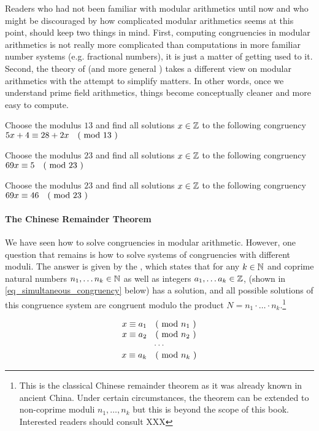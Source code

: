 Readers who had not been familiar with modular arithmetics until now and who might be discouraged by how complicated modular arithmetics seems at this point, should keep two things in mind. First, computing congruencies in modular arithmetics is not really more complicated than computations in more familiar number systems (e.g. fractional numbers), it is just a matter of getting used to it. Second, the theory of  (and more general ) takes a different view on modular arithmetics with the attempt to simplify matters. In other words, once we understand prime field arithmetics, things become conceptually cleaner and more easy to compute.
\begin{exercise}Choose the modulus $13$ and find all solutions $x\in \mathbb{Z}$ to the following congruency $5x+4 \equiv 28+2x \quad \text{( mod } 13 \text{ )}$
\end{exercise}
\begin{exercise}Choose the modulus $23$ and find all solutions $x\in \mathbb{Z}$ to the following congruency $69x \equiv 5 \quad \text{( mod } 23 \text{ )}$
\end{exercise}
\begin{exercise}Choose the modulus $23$ and find all solutions $x\in \mathbb{Z}$ to the following congruency $69x \equiv 46 \quad \text{( mod } 23 \text{ )}$
\end{exercise}
\paragraph{The Chinese Remainder Theorem} We have seen how to solve congruencies in modular arithmetic. However, one question that remains is how to solve systems of congruencies with different moduli. The answer is given by the , which states that for any $ k \in \mathbb{N} $ and coprime natural numbers $ n_1, \ldots n_k \in \mathbb{N} $ as well as integers $ a_1, \ldots a_k \in \mathbb{Z} $,   (shown in \ref{eq_simultaneous_congruency} below) has a solution, and all possible solutions of this congruence system are congruent modulo
the product $N= n_1 \cdot \ldots \cdot n_k $.\footnote{This is the classical Chinese remainder theorem as it was already known in ancient China. Under certain circumstances, the theorem can be extended to non-coprime moduli $ n_1, \ldots, n_k $ but this is beyond the scope of this book. Interested readers should consult XXX } 

\begin{equation}
\label{eq_simultaneous_congruency}
\begin{array}{c}
x \equiv a_1 \quad \text{( mod } n_1 \text{ )} \\
x \equiv a_2 \quad \text{( mod } n_2 \text{ )} \\
\cdots \\
x \equiv a_k \quad \text{( mod } n_k \text{ )} \\
\end{array}
\end{equation}

